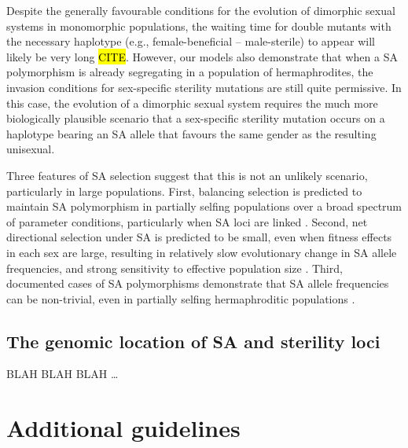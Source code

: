 \documentclass[9pt,twocolumn,twoside,lineno]{gsajnl}
\begin{document}
Despite the generally favourable conditions for the evolution of dimorphic sexual systems in monomorphic populations, the waiting time for double mutants with the necessary haplotype (e.g., female-beneficial -- male-sterile) to appear will likely be very long \hl{CITE}. However, our models also demonstrate that when a SA polymorphism is already segregating in a population of hermaphrodites, the invasion conditions for sex-specific sterility mutations are still quite permissive. In this case, the evolution of a dimorphic sexual system requires the much more biologically plausible scenario that a sex-specific sterility mutation occurs on a haplotype bearing an SA allele that favours the same gender as the resulting unisexual. 

Three features of SA selection suggest that this is not an unlikely scenario, particularly in large populations. First, balancing selection is predicted to maintain SA polymorphism in partially selfing populations over a broad spectrum of parameter conditions, particularly when SA loci are linked \citep{Patten2010,JordanConnallon2014,Olito2017}. Second, net directional selection under SA is predicted to be small, even when fitness effects in each sex are large, resulting in relatively slow evolutionary change in SA allele frequencies, and strong sensitivity to effective population size \citep{ConnallonClark2012}. Third, documented cases of SA polymorphisms demonstrate that SA allele frequencies can be non-trivial, even in partially selfing hermaphroditic populations \citep{Barson2015,LeeKelly2015}. 





\bigskip


\subsection{The genomic location of SA and sterility loci}

BLAH BLAH BLAH \ldots















\section{Additional guidelines}
\end{document}
